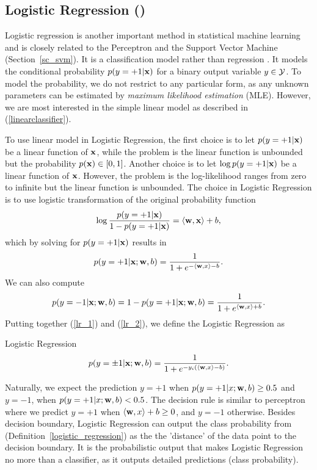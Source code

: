 {%
\subsection{Logistic Regression (\lr)}

Logistic regression is another important method in statistical machine learning and is closely related to the Perceptron and the Support Vector Machine (Section~\ref{sc_svm}).
It is a classification model rather than regression \citep{Bishop07}.
It models the conditional probability $p(y=+1|\mathbf {x})$ for a binary output variable $y\in\mathcal{Y}$.
To model the probability, we do not restrict to any particular form, as any unknown parameters can be estimated by \textit{maximum likelihood estimation} (MLE).
However, we are most interested in the simple linear model as described in (\ref{linearclassifier}).

To use linear model in Logistic Regression, the first choice is to let $p(y=+1|\mathbf {x})$ be a linear function of $\mathbf {x}$, while the problem is the linear function is unbounded but the probability $p(\mathbf {x})\in[0,1]$.
Another choice is to let $\log p(y=+1|\mathbf {x})$ be a linear function of $\mathbf {x}$. 
However, the problem is the log-likelihood ranges from zero to infinite but the linear function is unbounded.
The choice in Logistic Regression is to use logistic transformation of the original probability function
\begin{align*}
	\log\frac{p(y=+1|\mathbf {x})}{1-p(y=+1|\mathbf {x})} = \langle \mathbf {w}, \mathbf {x} \rangle + b,
\end{align*}
which by solving for $p(y=+1|\mathbf {x})$ results in 
\begin{align}
	p(y=+1|\mathbf {x};\mathbf {w},b) = \frac{1}{1+e^{ -\langle \mathbf {w}, x \rangle-b }}. \label{lr_1}
\end{align}
We can also compute
\begin{align}
	p(y=-1|\mathbf {x};\mathbf {w},b)=1-p(y=+1|\mathbf {x};\mathbf {w},b)=\frac{1}{1+e^{ \langle \mathbf {w}, x \rangle+b }}. \label{lr_2}
\end{align}
Putting together (\ref{lr_1}) and (\ref{lr_2}), we define the Logistic Regression as
\begin{definition}{Logistic Regression}\label{logistic_regression}
	\begin{align*}
		p(y=\pm1|\mathbf {x};\mathbf {w},b) = \frac{1}{1+e^{ -y_i(\langle \mathbf {w}, x \rangle-b) }}.
	\end{align*}
\end{definition}
Naturally, we expect the prediction $y=+1$ when $p(y=+1|x;\mathbf {w},b)\ge0.5$ and $y=-1$, when $p(y=+1|x;\mathbf {w},b)<0.5$.
The decision rule is similar to perceptron where we predict $y=+1$ when $\langle \mathbf {w}, x \rangle+b\ge0$, and $y=-1$ otherwise.
Besides decision boundary, Logistic Regression can output the class probability from (Definition~\ref{logistic_regression}) as the the 'distance' of the data point to the decision boundary.
It is the probabilistic output that makes Logistic Regression no more than a classifier, as it outputs detailed predictions (class probability).

}
